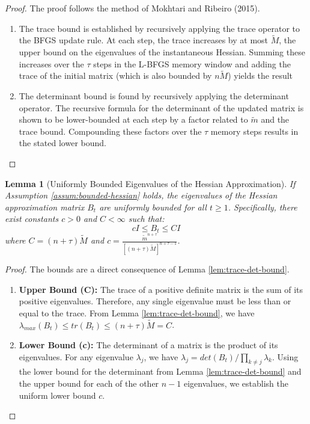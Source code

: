 \documentclass[a4paper,12pt]{article}
\newtheorem{lemma}[theorem]{Lemma}
\begin{document}
\begin{proof}
The proof follows the method of Mokhtari and Ribeiro (2015).
\begin{enumerate}
    \item The trace bound is established by recursively applying the trace operator to the BFGS update rule. At each step, the trace increases by at most $\tilde{M}$, the upper bound on the eigenvalues of the instantaneous Hessian. Summing these increases over the $\tau$ steps in the L-BFGS memory window and adding the trace of the initial matrix (which is also bounded by $n\tilde{M}$) yields the result 
    
    \item The determinant bound is found by recursively applying the determinant operator. The recursive formula for the determinant of the updated matrix is shown to be lower-bounded at each step by a factor related to $\tilde{m}$ and the trace bound. Compounding these factors over the $\tau$ memory steps results in the stated lower bound.
\end{enumerate}
\end{proof}

\begin{lemma}[Uniformly Bounded Eigenvalues of the Hessian Approximation]
\label{lem:eigenvalue-bound}
If Assumption \ref{assum:bounded-hessian} holds, the eigenvalues of the Hessian approximation matrix $B_t$ are uniformly bounded for all $t \ge 1$. Specifically, there exist constants $c>0$ and $C<\infty$ such that:
$$
cI \le B_t \le CI
$$
where $C = (n+\tau)\tilde{M}$ and $c = \frac{\tilde{m}^{n+\tau}}{[(n+\tau)\tilde{M}]^{n+\tau-1}}$.
\end{lemma}

\begin{proof}
The bounds are a direct consequence of Lemma \ref{lem:trace-det-bound}.
\begin{enumerate}
    \item \textbf{Upper Bound (C):} The trace of a positive definite matrix is the sum of its positive eigenvalues. Therefore, any single eigenvalue must be less than or equal to the trace. From Lemma \ref{lem:trace-det-bound}, we have $\lambda_{max}(B_t) \le tr(B_t) \le (n+\tau)\tilde{M} = C$.

    \item \textbf{Lower Bound (c):} The determinant of a matrix is the product of its eigenvalues. For any eigenvalue $\lambda_j$, we have $\lambda_j = det(B_t) / \prod_{k \ne j} \lambda_k$. Using the lower bound for the determinant from Lemma \ref{lem:trace-det-bound} and the upper bound for each of the other $n-1$ eigenvalues, we establish the uniform lower bound $c$.
\end{enumerate}
\end{proof}
\end{document}
